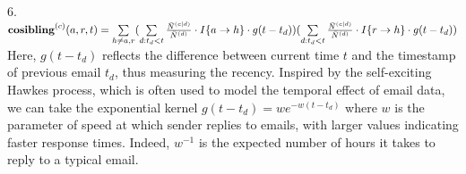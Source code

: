 \documentclass[a4paper]{article}
\begin{document}
6. $\textbf{cosibling}^{(c)}(a, r, t)=\sum\limits_{h \neq a, r}\Large(\sum\limits_{d: t_d<t} \frac{\bar N^{(c|d)}}{\bar N^{(d)}}\cdot I\{a\rightarrow h\}\cdot g(t-t_d)\Large)\Large(\sum\limits_{d: t_d<t} \frac{\bar N^{(c|d)}}{\bar N^{(d)}}\cdot I\{r\rightarrow h\}\cdot g(t-t_d)\Large)$\\\newline
Here, $g(t-t_d)$ reflects the difference between current time $t$ and the timestamp of previous email $t_d$, thus measuring the recency. Inspired by the self-exciting Hawkes process, which is often used to model the temporal effect of email data, we can take the exponential kernel $g(t-t_d)=we^{-w(t-t_d)}$ where $w$ is the parameter of speed at
which sender replies to emails, with larger values indicating faster response times. Indeed, $w^{-1}$ is the expected number of hours it takes to reply to a typical email.
\end{document}
